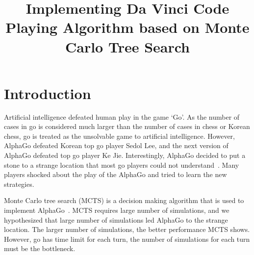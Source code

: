 \documentclass[conference]{IEEEtran}
\begin{document}
\title{Implementing Da Vinci Code Playing Algorithm based on Monte Carlo Tree Search}

\author{
\and
{}
\and
{}
}

\maketitle


\begin{abstract}
%
\end{abstract}




\IEEEpeerreviewmaketitle


\section{Introduction}

Artificial intelligence defeated human play in the game `Go'.
As the number of cases in go is considered much larger than the number of cases in chess or Korean chess, go is treated as the unsolvable game to artificial intelligence.
However, AlphaGo defeated Korean top go player Sedol Lee, and the next version of AlphaGo defeated top go player Ke Jie.
Interestingly, AlphaGo decided to put a stone to a strange location that most go players could not understand~\cite{wierd_alphago}.
Many players shocked about the play of the AlphaGo and tried to learn the new strategies.

Monte Carlo tree search (MCTS) is a decision making algorithm that is used to implement AlphaGo~\cite{silver2016mastering_alphago}.
MCTS requires large number of simulations, and we hypothesized that large number of simulations led AlphaGo to the strange location.
The larger number of simulations, the better performance MCTS shows.
However, go has time limit for each turn, the number of simulations for each turn must be the bottleneck.
\end{document}
